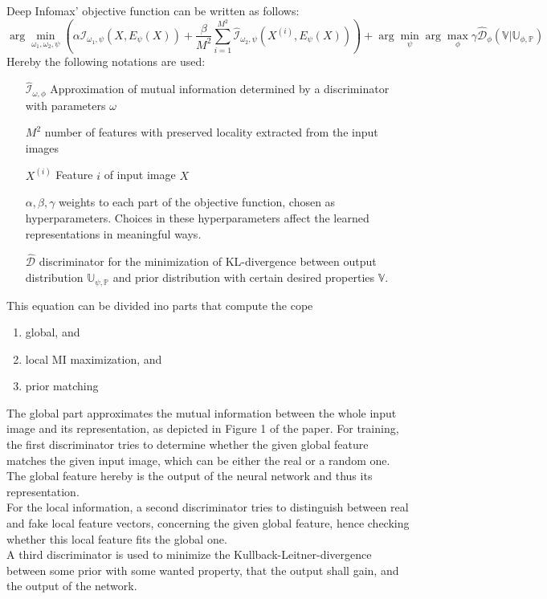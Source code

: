 \documentclass[]{article}
\begin{document}
Deep Infomax' objective function can be written as follows:
\begin{equation}
	\arg \min_{\omega_1, \omega_2, \psi} ( \alpha\hat{\mathcal{I}}_{\omega_1,\psi}(X, E_\psi(X)) +\frac{\beta}{M^2}\sum_{i=1}^{M^2} \hat{\mathcal{I}}_{\omega_2,\psi}(X^{(i)}, E_\psi(X)) ) + \arg \min_\psi \arg \max_\phi \gamma\hat{\mathcal{D}}_\phi(\mathbb{V}|\mathbb{U}_{\phi,\mathbb{P}})
\end{equation}
Hereby the following notations are used:
\begin{itemize}
	\item[$\hat{\mathcal{I}}_{\omega,\phi}$] Approximation of mutual information determined by a discriminator with parameters $\omega$
	\item[$M^2$] number of features with preserved locality extracted from the input images
	\item[$X^{(i)}$] Feature $i$ of input image $X$
	\item[$\alpha,\beta,\gamma$] weights to each part of the objective function, chosen as hyperparameters. Choices in these hyperparameters affect the learned representations in meaningful ways.
	\item[$\hat{\mathcal{D}}$] discriminator for the minimization of KL-divergence between output distribution $\mathbb{U_{\psi,\mathbb{P}}}$ and prior distribution with certain desired properties $\mathbb{V}$.
\end{itemize}

This equation can be divided ino parts that compute the cope 
\begin{enumerate}
	\item global, and
	\item local MI maximization, and
	\item prior matching
\end{enumerate}
The global part approximates the mutual information between the whole input image and its representation, as depicted in Figure 1 of the paper. For training, the first discriminator tries to determine whether the given global feature matches the given input image, which can be either the real or a random one. The global feature hereby is the output of the neural network and thus its representation. \\
For the local information, a second discriminator tries to distinguish between real and fake local feature vectors, concerning the given global feature, hence checking whether this local feature fits the global one.\\
A third discriminator is used to minimize the Kullback-Leitner-divergence between some prior with some wanted property, that the output shall gain, and the output of the network.
\end{document}
